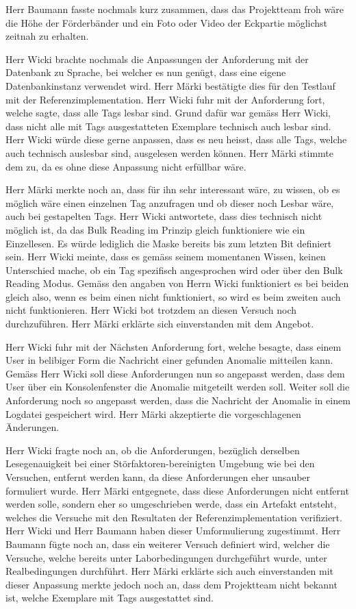 \documentclass[parskip=full, a4paper]{scrreprt}
\begin{document}
Herr Baumann fasste nochmals kurz zusammen, dass das Projektteam froh wäre die Höhe der Förderbänder und ein Foto oder Video der Eckpartie möglichst zeitnah zu erhalten.

Herr Wicki brachte nochmals die Anpassungen der Anforderung mit der Datenbank zu Sprache, bei welcher es nun genügt, dass eine eigene Datenbankinstanz verwendet wird. Herr Märki bestätigte dies für den Testlauf mit der Referenzimplementation. Herr Wicki fuhr mit der Anforderung fort, welche sagte, dass alle Tags lesbar sind. Grund dafür war gemäss Herr Wicki, dass nicht alle mit Tags ausgestatteten Exemplare technisch auch lesbar sind. Herr Wicki würde diese gerne anpassen, dass es neu heisst, dass alle Tags, welche auch technisch auslesbar sind, ausgelesen werden können. Herr Märki stimmte dem zu, da es ohne diese Anpassung nicht erfüllbar wäre.

Herr Märki merkte noch an, dass für ihn sehr interessant wäre, zu wissen, ob es möglich wäre einen einzelnen Tag anzufragen und ob dieser noch Lesbar wäre, auch bei gestapelten Tags. Herr Wicki antwortete, dass dies technisch nicht möglich ist, da das Bulk Reading im Prinzip gleich funktioniere wie ein Einzellesen. Es würde lediglich die Maske bereits bis zum letzten Bit definiert sein. Herr Wicki meinte, dass es gemäss seinem momentanen Wissen, keinen Unterschied mache, ob ein Tag spezifisch angesprochen wird oder über den Bulk Reading Modus. Gemäss den angaben von Herrn Wicki funktioniert es bei beiden gleich also, wenn es beim einen nicht funktioniert, so wird es beim zweiten auch nicht funktionieren. Herr Wicki bot trotzdem an diesen Versuch noch durchzuführen. Herr Märki erklärte sich einverstanden mit dem Angebot.

Herr Wicki fuhr mit der Nächsten Anforderung fort, welche besagte, dass einem User in belibiger Form die Nachricht einer gefunden Anomalie mitteilen kann. Gemäss Herr Wicki soll diese Anforderungen nun so angepasst werden, dass dem User über ein Konsolenfenster die Anomalie mitgeteilt werden soll. Weiter soll die Anforderung noch so angepasst werden, dass die Nachricht der Anomalie in einem Logdatei gespeichert wird. Herr Märki akzeptierte die vorgeschlagenen Änderungen.

Herr Wicki fragte noch an, ob die Anforderungen, bezüglich derselben Lesegenauigkeit bei einer Störfaktoren-bereinigten Umgebung wie bei den Versuchen, entfernt werden kann, da diese Anforderungen eher unsauber formuliert wurde. Herr Märki entgegnete, dass diese Anforderungen nicht entfernt werden solle, sondern eher so umgeschrieben werde, dass ein Artefakt entsteht, welches die Versuche mit den Resultaten der Referenzimplementation verifiziert. Herr Wicki und Herr Baumann haben dieser Umformulierung zugestimmt.
Herr Baumann fügte noch an, dass ein weiterer Versuch definiert wird, welcher die Versuche, welche bereits unter Laborbedingungen durchgeführt wurde, unter Realbedingungen durchführt. Herr Märki erklärte sich auch einverstanden mit dieser Anpassung merkte jedoch noch an, dass dem Projektteam nicht bekannt ist, welche Exemplare mit Tags ausgestattet sind.
\end{document}
